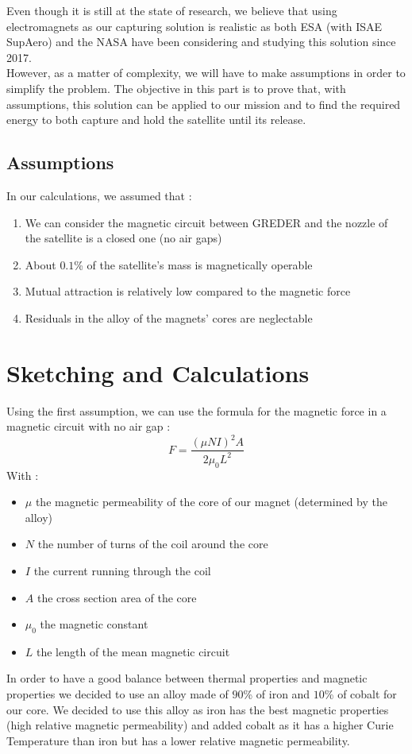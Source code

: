 Even though it is still at the state of research, we believe that using electromagnets as our capturing solution is realistic as both ESA (with ISAE SupAero) and the NASA have been considering and studying this solution since 2017.\\

However, as a matter of complexity, we will have to make assumptions in order to simplify the problem. The objective in this part is to prove that, with assumptions, this solution can be applied to our mission and to find the required energy to both capture and hold the satellite until its release.
\subsection{Assumptions}
In our calculations, we assumed that :
\begin{enumerate}
	\item We can consider the magnetic circuit between GREDER and the nozzle of the satellite is a closed one (no air gaps)
	\item About $0.1$\% of the satellite's mass is magnetically operable
	\item Mutual attraction is relatively low compared to the magnetic force
	\item Residuals in the alloy of the magnets' cores are neglectable
\end{enumerate}
\section{Sketching and Calculations}
Using the first assumption, we can use the formula for the magnetic force in a magnetic circuit with no air gap :
\begin{equation}
F = \frac{(\mu NI)^2 A}{2\mu_0 L^2}
\end{equation}
With : 
\begin{itemize}
	\item $\mu$ the magnetic permeability of the core of our magnet (determined by the alloy)
	\item $N$ the number of turns of the coil around the core
	\item $I$ the current running through the coil
	\item $A$ the cross section area of the core
	\item $\mu_0$ the magnetic constant
	\item $L$ the length of the mean magnetic circuit
\end{itemize}
In order to have a good balance between thermal properties and magnetic properties we decided to use an alloy made of $90$\% of iron and $10$\% of cobalt for our core. We decided to use this alloy as iron has the best magnetic properties (high relative magnetic permeability) and added cobalt as it has a higher Curie Temperature than iron but has a lower relative magnetic permeability.

